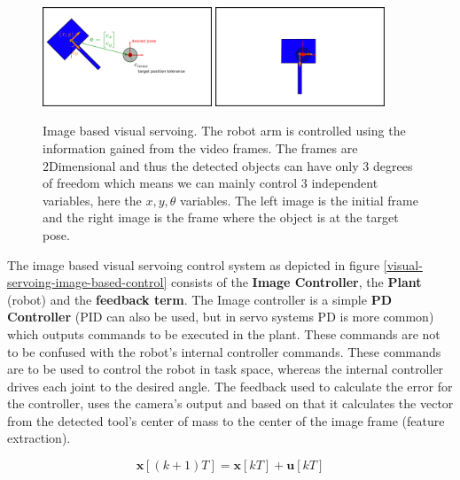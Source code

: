 \begin{center}
\begin{figure}[H]
\centering
\includegraphics[width=0.45\textwidth]{images/visual_servo_start.png}
\includegraphics[width=0.45\textwidth]{images/visual_servo_end.png}\\
\caption{Image based visual servoing. The robot arm is controlled using the information gained from the video frames. The frames are 2Dimensional and thus 
the detected objects can have only 3 degrees of freedom which means we can mainly control 3 independent variables, here the $x,y,θ$ variables. The left image 
is the initial frame and the right image is the frame where the object is at the target pose.}
\label{image-based-servoing-start-end}
\end{figure}
\end{center}

The image based visual servoing control system as depicted in figure \ref{visual-servoing-image-based-control} consists of the \textbf{Image Controller}, the \textbf{Plant} (robot) and the \textbf{feedback term}. The Image controller is a simple 
\textbf{PD Controller} (PID can also be used, but in servo systems PD is more common) which outputs commands to be executed in the plant. These commands are not to be confused with the robot's internal controller commands. 
These commands are to be used to control the robot in task space, whereas the internal controller drives each joint to the desired angle. The feedback used to calculate the error for the controller, uses the camera's 
output and based on that it calculates the vector from the detected tool's center of mass to the center of the image frame (feature extraction).

\begin{equation}
\mathbf{x}[(k+1)T] = \mathbf{x}[kT] + \mathbf{u}[kT]
\end{equation}


